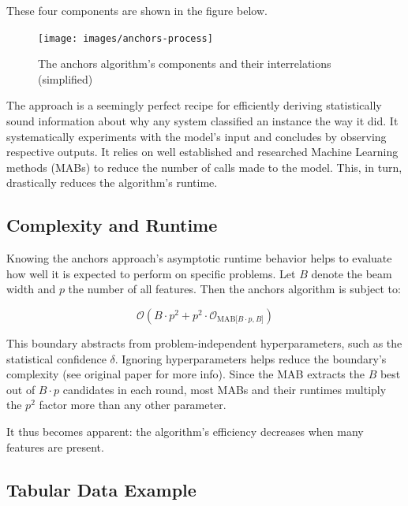 \documentclass[
  10pt,
]{scrbook}
\begin{document}
These four components are shown in the figure below.

\begin{figure}

{\centering \texttt{[image: images/anchors-process]} 

}

\caption{The anchors algorithm’s components and their interrelations (simplified)}\label{fig:unnamed-chunk-30}
\end{figure}

The approach is a seemingly perfect recipe for efficiently deriving statistically sound information about why any system classified an instance the way it did. It systematically experiments with the model's input and concludes by observing respective outputs. It relies on well established and researched Machine Learning methods (MABs) to reduce the number of calls made to the model. This, in turn, drastically reduces the algorithm's runtime.

\hypertarget{complexity-and-runtime}{%
\subsection{Complexity and Runtime}\label{complexity-and-runtime}}

Knowing the anchors approach's asymptotic runtime behavior helps to evaluate how well it is expected to perform on specific problems. Let \(B\) denote the beam width and \(p\) the number of all features. Then the anchors algorithm is subject to:

\[\mathcal{O}(B\cdot{}p^2+p^2\cdot\mathcal{O}_{\textrm{MAB}\lbrack{}B\cdot{}p,B\rbrack})\]

This boundary abstracts from problem-independent hyperparameters, such as the statistical confidence \(\delta\). Ignoring hyperparameters helps reduce the boundary's complexity (see original paper for more info). Since the MAB extracts the \(B\) best out of \(B \cdot p\) candidates in each round, most MABs and their runtimes multiply the \(p^2\) factor more than any other parameter.

It thus becomes apparent: the algorithm's efficiency decreases when many features are present.

\hypertarget{tabular-data-example}{%
\subsection{Tabular Data Example}\label{tabular-data-example}}
\end{document}
